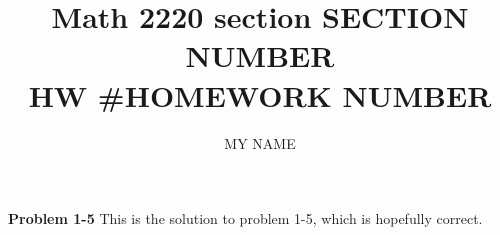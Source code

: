 \documentclass[11pt]{amsart}
\newcommand{\name}{MY NAME}
\newcommand{\sectionnum}{SECTION NUMBER}
\newcommand{\hwnumber}{HOMEWORK NUMBER}
\newcommand{\problem}[1]{\bigskip\noindent\textbf{Problem #1}}
\begin{document}
\title{Math 2220 section \sectionnum\\ HW \#\hwnumber}
\author{\name}
\maketitle


\problem{1-5} This is the solution to problem 1-5, which is hopefully correct.
\end{document}
